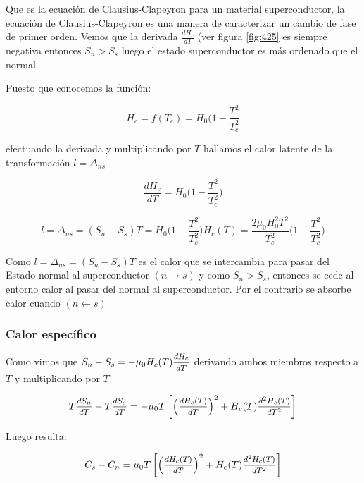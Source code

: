 Que es la ecuación de Clausius-Clapeyron para un material superconductor, la ecuación de Clausius-Clapeyron es una manera de caracterizar un cambio de fase de primer orden. Vemos que la derivada $\frac{dH_{c}}{dT}$ (ver figura \ref{fig:425} es siempre negativa entonces $S_{n}>S_{s}$ luego el estado superconductor es más ordenado que el normal.

Puesto que conocemos la función:

\begin{equation}
H_{c} = f(T_{c})=H_{0}\big( 1- \frac{T^{2}}{T_{c}^{2}}
\end{equation}

efectuando la derivada y multiplicando por $T$ hallamos el calor latente de la transformación $l=\Delta_{ns}$ 

\begin{equation*}
\frac{dH_{c}}{dT}=H_{0}\big( 1- \frac{T^{2}}{T_{c}^{2}} \big)
\end{equation*}

\begin{equation}
l=\Delta_{ns} = (S_{n}-S_{s})T=H_{0}\big( 1- \frac{T^{2}}{T_{c}^{2}}\big) H_{c}(T) = \frac{2\mu_{0}H_{0}^{2}T^{2}}{T_{c}^{2}}\big( 1- \frac{T^{2}}{T_{c}^{2}} \big)
\end{equation}

Como $l=\Delta_{ns}= (S_{n}-S_{s})T$ es el calor que se intercambia para pasar del Estado normal al superconductor $(n\rightarrow s)$ y como $S_{n}>S_{s}$, entonces se cede al entorno calor al pasar del normal al superconductor. Por el contrario se absorbe calor cuando $(n \leftarrow s)$

\subsubsection{Calor específico}

Como vimos que $S_{n}-S_{s}=-\mu_{0}H_{c}(T)\mfrac{dH_{c}}{dT}$ derivando ambos miembros respecto a $T$ y multiplicando por $T$

\begin{equation}
T\mfrac{dS_{n}}{dT}-T\mfrac{dS_{s}}{dT}=-\mu_{0}T\left[\left( \mfrac{dH_{c}(T)}{dT} \right)^{2} + H_{c}(T) \mfrac{d^{2}H_{c}(T)}{dT^{2}} \right] 
\end{equation}

Luego resulta:

\begin{equation}
C_{s}-C_{n}=\mu_{0}T\left[\left( \mfrac{dH_{c}(T)}{dT} \right)^{2} + H_{c}(T) \mfrac{d^{2}H_{c}(T)}{dT^{2}} \right] 
\end{equation}

